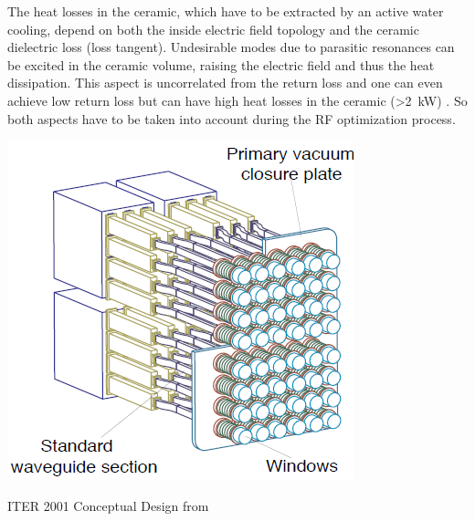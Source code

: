 The heat losses in the ceramic, which have to be extracted by an active water cooling, depend on both the inside electric field topology and the ceramic dielectric loss (loss tangent). Undesirable modes due to parasitic resonances can be excited in the ceramic volume, raising the electric field and thus the heat dissipation. This aspect is uncorrelated from the return loss and one can even achieve low return loss but can have high heat losses in the ceramic (>2~\si{kW}) . So both aspects have to be taken into account during the RF optimization process.


\begin{marginfigure}
	\centering
	\includegraphics[width=1.0\linewidth]{figures/chap3/ITER_antenna/ITER_LH_antenna_old}
	\caption{ITER 2001 Conceptual Design from \cite{bibet2001-1}}
	\label{fig:iterlhantennaold}
\end{marginfigure}


